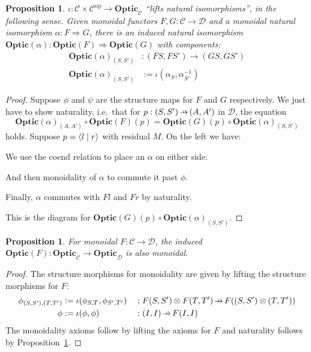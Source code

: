 \documentclass[11pt,letterpaper]{article}
\theoremstyle{plain}
\newtheorem{proposition}[theorem]{Proposition}
\theoremstyle{definition}
\newcommand{\C}{\mathscr{C}}
\newcommand{\D}{\mathscr{D}}
\newcommand{\Optic}{\mathbf{Optic}}
\newcommand{\op}{\mathrm{op}}
\newcommand{\rep}[2]{{\ensuremath \left\langle #1 \mid #2 \right\rangle}}
\newcommand{\hto}{\ensuremath{\,\mathaccent\shortmid\rightarrow\,}}
\begin{document}
\begin{proposition}\label{prop:iota-naturality}
$\iota : \C \times \C^\op \to \Optic_\C$ ``lifts natural isomorphisms'', in the following sense. Given monoidal functors $F, G : \C \to \D$ and a monoidal natural isomorphism $\alpha : F \Rightarrow G$, there is an induced natural isomorphism $\Optic(\alpha) : \Optic(F) \Rightarrow \Optic(G)$ with components:
\begin{align*}
{\Optic(\alpha)}_{(S, S')} &: (FS, FS') \to (GS, GS') \\
{\Optic(\alpha)}_{(S, S')} &:= \iota(\alpha_{S}, \alpha^{-1}_{S'})
\end{align*}
\end{proposition}
\begin{proof}
Suppose $\phi$ and $\psi$ are the structure maps for $F$ and $G$ respectively. We just have to show naturality, i.e.\ that for $p : (S, S') \hto (A, A')$ in $\D$, the equation \[\Optic(\alpha)_{(A, A')} \circ \Optic(F)(p) = \Optic(G)(p) \circ \Optic(\alpha)_{(S, S')}\] holds. Suppose $p = \rep{l}{r}$ with residual $M$. On the left we have:
  \begin{center}
    
  \end{center}
  We use the coend relation to place an $\alpha$ on either side:
  \begin{center}
    
  \end{center}
  And then monoidality of $\alpha$ to commute it past $\phi$.
  \begin{center}
    
  \end{center}
  Finally, $\alpha$ commutes with $F l$ and $F r$ by naturality.
  \begin{center}
    
  \end{center}
  This is the diagram for $\Optic(G)(p) \circ {\Optic(\alpha)}_{(S, S')}$.
\end{proof}

\begin{proposition}
  For monoidal $F : \C \to \D$, the induced $\Optic(F) : \Optic_\C \to \Optic_\D$ is also monoidal.
\end{proposition}
\begin{proof}
The structure morphisms for monoidality are given by lifting the structure morphisms for $F$:
\begin{align*}
\phi_{(S, S'), (T, T')} &:= \iota(\phi_{S, T}, \phi_{S', T'}) &&: F(S, S') \otimes F(T, T') \hto F((S, S') \otimes (T, T')) \\
\phi &:= \iota(\phi, \phi) &&: (I, I) \hto F(I, I)
\end{align*}
The monoidality axioms follow by lifting the axioms for $F$ and naturality follows by Proposition~\ref{prop:iota-naturality}.
\end{proof}
\end{document}
